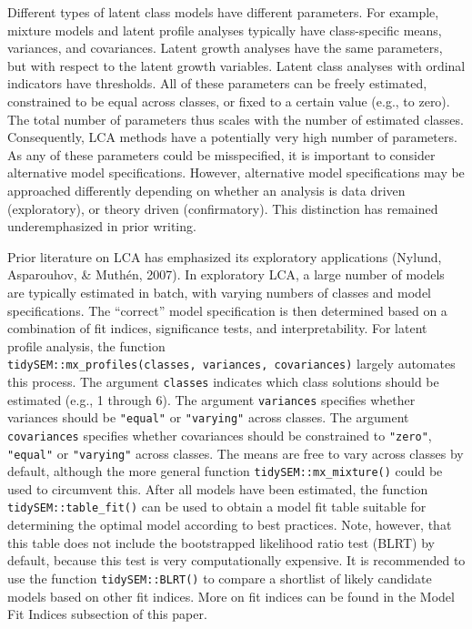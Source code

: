 \documentclass[
  ,man,floatsintext]{apa6}
\begin{document}
Different types of latent class models have different parameters. For
example, mixture models and latent profile analyses typically have
class-specific means, variances, and covariances. Latent growth analyses
have the same parameters, but with respect to the latent growth
variables. Latent class analyses with ordinal indicators have
thresholds. All of these parameters can be freely estimated, constrained
to be equal across classes, or fixed to a certain value (e.g., to zero).
The total number of parameters thus scales with the number of estimated
classes. Consequently, LCA methods have a potentially very high number
of parameters. As any of these parameters could be misspecified, it is
important to consider alternative model specifications. However,
alternative model specifications may be approached differently depending
on whether an analysis is data driven (exploratory), or theory driven
(confirmatory). This distinction has remained underemphasized in prior
writing.

Prior literature on LCA has emphasized its exploratory applications
(Nylund, Asparouhov, \& Muthén, 2007). In exploratory LCA, a large number of models
are typically estimated in batch, with varying numbers of classes and
model specifications. The ``correct'' model specification is then
determined based on a combination of fit indices, significance tests,
and interpretability. For latent profile analysis, the function
\texttt{tidySEM::mx\_profiles(classes,\ variances,\ covariances)} largely
automates this process. The argument \texttt{classes} indicates which class
solutions should be estimated (e.g., 1 through 6). The argument
\texttt{variances} specifies whether variances should be \texttt{"equal"} or
\texttt{"varying"} across classes. The argument \texttt{covariances} specifies whether
covariances should be constrained to \texttt{"zero"}, \texttt{"equal"} or \texttt{"varying"}
across classes. The means are free to vary across classes by default,
although the more general function \texttt{tidySEM::mx\_mixture()} could be used
to circumvent this. After all models have been estimated, the function
\texttt{tidySEM::table\_fit()} can be used to obtain a model fit table suitable
for determining the optimal model according to best practices. Note,
however, that this table does not include the bootstrapped likelihood
ratio test (BLRT) by default, because this test is very computationally
expensive. It is recommended to use the function \texttt{tidySEM::BLRT()} to
compare a shortlist of likely candidate models based on other fit
indices. More on fit indices can be found in the Model Fit Indices
subsection of this paper.
\end{document}
